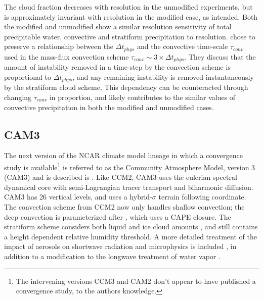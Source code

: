 The cloud fraction decreases with resolution in the unmodified experiments, but is approximately invariant with resolution in the modified case, as intended. Both the modified and unmodified show a similar resolution sensitivity of total precipitable water, convective and stratiform precipitation to resolution. \cite{WETAL1995CD} chose to preserve a relationship between the $\Delta t_{phys}$ and the convective time-scale $\tau_{conv}$ used in the mass-flux convection scheme $\tau_{conv} \sim 3 \times \Delta t_{phys}$. They discuss that the amount of instability removed in a time-step by the convection scheme is proportional to $\Delta t_{phys}$, and any remaining instability is removed instantaneously by the stratiform cloud scheme. This dependency can be counteracted through changing $\tau_{conv}$ in proportion, and likely contributes to the similar values of convective precipitation in both the modified and unmodified cases.

\subsection{CAM3}

The next version of the NCAR climate model lineage in which a convergence study is available\footnote{The intervening versions CCM3 and CAM2 don't appear to have published a convergence study, to the authors knowledge.} is referred to as the Community Atmosphere Model, version 3 (CAM3) and is described is \cite{CAM3}. Like CCM2, CAM3 uses the eulerian spectral dynamical core with semi-Lagrangian tracer transport and biharmonic diffusion. CAM3 has 26 vertical levels, and uses a hybrid-$\sigma$ terrain following coordinate. The \cite{H1994JGR} convection scheme from CCM2 now only handles shallow convection; the deep convection is parameterized after \cite{ZM1995AO}, which uses a CAPE closure. The stratiform scheme considers both liquid and ice cloud amounts \citep{RK1998JCLIM,ZETAL2003JGR}, and still contains a height dependent relative humidity threshold. A more detailed treatment of the impact of aerosols on shortwave radiation and microphysics is included \citep{CAM3}, in addition to a modification to the longwave treatment of water vapor \citep{CETAL2002JGR}.

